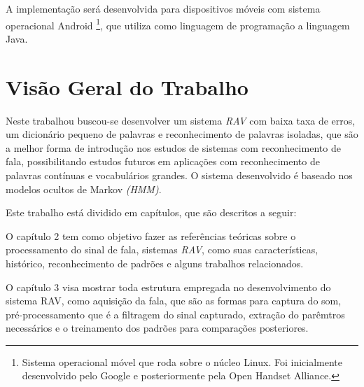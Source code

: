 A implementação será desenvolvida para dispositivos móveis com sistema operacional Android \footnote{ Sistema operacional móvel que roda sobre o núcleo Linux. Foi inicialmente desenvolvido pelo Google e posteriormente pela Open Handset Alliance.}, que utiliza como linguagem de programação a linguagem Java.

\section{Visão Geral do Trabalho}
Neste trabalhou buscou-se desenvolver um sistema \textit{RAV} com baixa taxa de erros, um dicionário pequeno de palavras e reconhecimento de palavras isoladas, que são a melhor forma de introdução nos estudos de sistemas com reconhecimento de fala, possibilitando estudos futuros em aplicações com reconhecimento de palavras contínuas e vocabulários grandes. O sistema desenvolvido é baseado nos modelos ocultos de Markov \textit{(HMM)}. 

Este trabalho está dividido em %
capítulos, que são descritos a seguir:

O capítulo 2 tem como objetivo fazer as referências teóricas sobre o processamento do sinal de fala, sistemas \textit{RAV}, como suas características, histórico, reconhecimento de padrões e alguns trabalhos relacionados.

O capítulo 3 visa mostrar toda estrutura empregada no desenvolvimento do sistema RAV, como aquisição da fala, que são as formas para captura do som, pré-processamento que é a filtragem do sinal capturado, extração do parêmtros necessários e o treinamento dos padrões para comparações posteriores.









